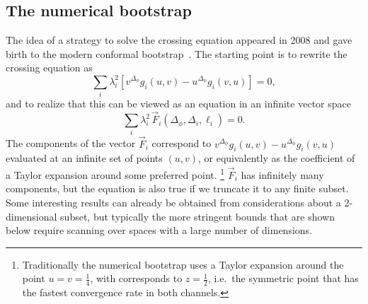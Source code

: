 \documentclass[a4paper,12pt]{article}
\numberwithin{equation}{section}
\begin{document}
\subsection{The numerical bootstrap}

The idea of a strategy to solve the crossing equation appeared in 2008 and gave birth to the modern conformal bootstrap~\cite{Rattazzi:2008pe}.
The starting point is to rewrite the crossing equation as
\begin{equation}
	\sum_i \lambda_i^2 \left[ v^{\Delta_\phi} g_i(u,v)
	- u^{\Delta_\phi} g_i(v,u) \right] = 0,
\end{equation}
and to realize that this can be viewed as an equation in an infinite vector space
\begin{equation}
	\sum_i \lambda_i^2 \, \vec{F}_i(\Delta_\phi, \Delta_i, \ell_i) = 0.
\end{equation}
The components of the vector $\vec{F}_i$ correspond to $v^{\Delta_\phi} g_i(u,v) - u^{\Delta_\phi} g_i(v,u)$ evaluated at an infinite set of points $(u,v)$, or equivalently as the coefficient of a Taylor expansion around some preferred point.%
%
\footnote{Traditionally the numerical bootstrap uses a Taylor expansion around the point $u = v = \frac{1}{4}$, with corresponds to $z = \frac{1}{2}$, i.e.~the symmetric point that has the fastest convergence rate in both channels.}
%
$\vec{F}_i$ has infinitely many components, but the equation is also true if we truncate it to any finite subset. Some interesting results can already be obtained from considerations about a 2-dimensional subset, but typically the more stringent bounds that are shown below require scanning over spaces with a large number of dimensions.
\end{document}
